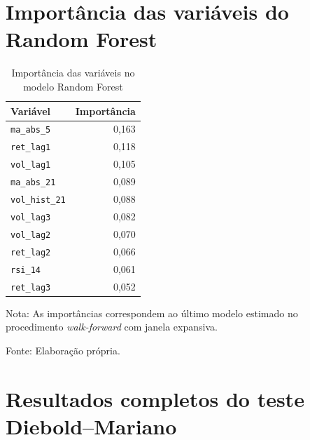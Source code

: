 \section{Importância das variáveis do Random Forest}

\begin{table}[H]
    \centering
    \caption{Importância das variáveis no modelo Random Forest}
    \label{tab:importancia_rf}
    \begin{tabular}{lr}
        \toprule
        Variável & Importância \\
        \midrule
        \texttt{ma\_abs\_5}    & 0,163 \\
        \texttt{ret\_lag1}     & 0,118 \\
        \texttt{vol\_lag1}     & 0,105 \\
        \texttt{ma\_abs\_21}   & 0,089 \\
        \texttt{vol\_hist\_21} & 0,088 \\
        \texttt{vol\_lag3}     & 0,082 \\
        \texttt{vol\_lag2}     & 0,070 \\
        \texttt{ret\_lag2}     & 0,066 \\
        \texttt{rsi\_14}       & 0,061 \\
        \texttt{ret\_lag3}     & 0,052 \\
        \bottomrule
    \end{tabular}
    \begin{center}
        \footnotesize
        Nota: As importâncias correspondem ao último modelo estimado 
        no procedimento \textit{walk-forward} com janela expansiva.
        
        Fonte: Elaboração própria.
    \end{center}
\end{table}

\section{Resultados completos do teste Diebold–Mariano}

